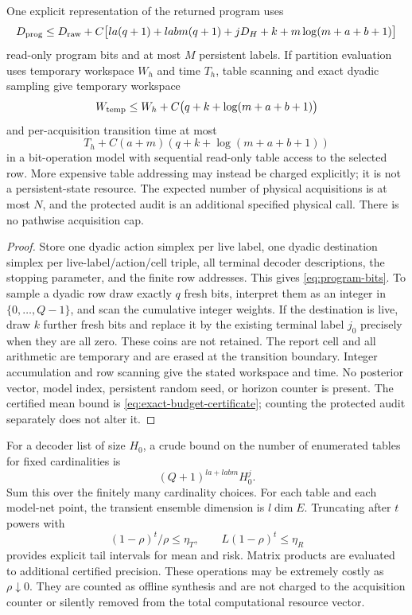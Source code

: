 \begin{proposition}\label{prop:description}
One explicit representation of the returned program uses
\begin{equation}\label{eq:program-bits}
 D_{\rm prog}\le D_{\rm raw}
  +C\bigl[la(q+1)+labm(q+1)+jD_H+k+m\log(m+a+b+1)\bigr]
\end{equation}
read-only program bits and at most $M$ persistent labels. If partition evaluation uses temporary workspace $W_h$ and time $T_h$, table scanning and exact dyadic sampling give temporary workspace
\begin{equation}\label{eq:general-workspace}
 W_{\rm temp}\le W_h+C\bigl(q+k+\log(m+a+b+1)\bigr)
\end{equation}
and per-acquisition transition time at most
\begin{equation}\label{eq:general-time}
 T_h+C(a+m)(q+k+\log(m+a+b+1))
\end{equation}
in a bit-operation model with sequential read-only table access to the selected row. More expensive table addressing may instead be charged explicitly; it is not a persistent-state resource. The expected number of physical acquisitions is at most $N$, and the protected audit is an additional specified physical call. There is no pathwise acquisition cap.
\end{proposition}
\begin{proof}
Store one dyadic action simplex per live label, one dyadic destination simplex per live-label/action/cell triple, all terminal decoder descriptions, the stopping parameter, and the finite row addresses. This gives \eqref{eq:program-bits}. To sample a dyadic row draw exactly $q$ fresh bits, interpret them as an integer in $\{0,\ldots,Q-1\}$, and scan the cumulative integer weights. If the destination is live, draw $k$ further fresh bits and replace it by the existing terminal label $j_0$ precisely when they are all zero. These coins are not retained. The report cell and all arithmetic are temporary and are erased at the transition boundary. Integer accumulation and row scanning give the stated workspace and time. No posterior vector, model index, persistent random seed, or horizon counter is present. The certified mean bound is \eqref{eq:exact-budget-certificate}; counting the protected audit separately does not alter it.
\end{proof}

For a decoder list of size $H_0$, a crude bound on the number of enumerated tables for fixed cardinalities is
\begin{equation}\label{eq:search-count}
 (Q+1)^{la+labm}H_0^j.
\end{equation}
Sum this over the finitely many cardinality choices. For each table and each model-net point, the transient ensemble dimension is $l\dim E$. Truncating after $t$ powers with
\[
 (1-\rho)^t/\rho\le\eta_T,\qquad L(1-\rho)^t\le\eta_R
\]
provides explicit tail intervals for mean and risk. Matrix products are evaluated to additional certified precision. These operations may be extremely costly as $\rho\downarrow0$. They are counted as offline synthesis and are not charged to the acquisition counter or silently removed from the total computational resource vector.

